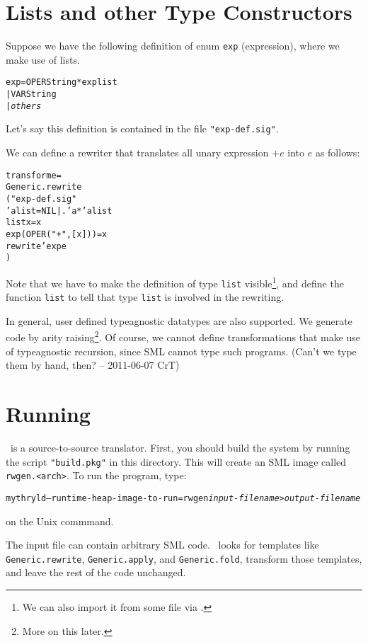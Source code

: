 \section{Lists and other Type Constructors}

Suppose we have the following definition of enum
\verb|exp| (expression), where we make use of lists.
\begin{alltt}
  \DATATYPE exp = OPER \OF String * exp list
                | VAR \OF String
                | {\em others}
\end{alltt}
Let's say this definition is contained in the file \verb|"exp-def.sig"|.

We can define a rewriter that translates all unary expression $+e$ 
into $e$ as follows:
\begin{alltt}
   \FUN transform e =
   Generic.rewrite
   ( \LET \INCLUDE "exp-def.sig"
          \DATATYPE 'a list = NIL | . \OF 'a * 'a list 
          \FUN list x = x
          \FUN exp (OPER("+",[x])) = x
     \IN  rewrite'exp e
     \END
   )
\end{alltt}
 Note that we have to make the definition of
type \verb|list| visible\footnote{We can also import it from some file
via \INCLUDE.}, and define the function \verb|list| to tell \RewriteGen{}
that type \verb|list| is involved in the rewriting. 

 In general, user defined typeagnostic datatypes are also supported.
We generate code by arity raising\footnote{More on this later.}.
 Of course, we cannot define transformations that make use of 
typeagnostic recursion, since SML cannot type such programs.
(Can't we type them by hand, then? -- 2011-06-07 CrT)

\section{Running \RewriteGen}

  \RewriteGen\ is a source-to-source translator.  First, you should
build the system by running the script \verb|"build.pkg"| in this
directory.  This will create an SML image called \verb|rwgen.<arch>|.
To run the program, type:
\begin{alltt}
    mythryld --runtime-heap-image-to-run=rwgen {\em input-filename} > {\em output-filename}
\end{alltt}
\noindent on the Unix commmand.

The input file can contain arbitrary SML code.  \RewriteGen\ looks
for templates like \verb|Generic.rewrite|, \verb|Generic.apply|,
and \verb|Generic.fold|, transform those templates, and
leave the rest of the code unchanged.

